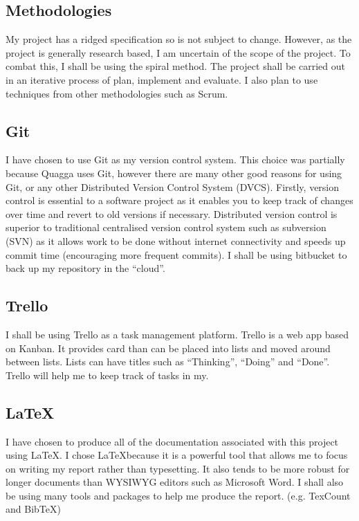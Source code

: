 \documentclass[12pt]{report}
\begin{document}
\subsection{Methodologies}
My project has a ridged specification so is not subject to change.
However, as the project is generally research based, I am uncertain of the scope
of the project. To combat this, I shall be using the spiral method. The project
shall be carried out in an iterative process of plan, implement and evaluate. I
also plan to use techniques from other methodologies such as Scrum. 

\subsection{Git}
I have chosen to use Git\cite{git} as my version control system. This choice was
partially because Quagga uses Git, however there are many other good reasons for
using Git, or any other Distributed Version Control System (DVCS).
 Firstly, version control
is essential to a software project as it enables you to keep track of changes
over time and revert to old versions if necessary. Distributed version control
is superior to traditional centralised version control system such as subversion
(SVN) as it allows work to be done without internet connectivity and speeds up
commit time (encouraging more frequent commits). I shall be using bitbucket to
back up my repository in the ``cloud''.

\subsection{Trello}
I shall be using Trello\cite{trello} as a task management platform. Trello is a
web app based on Kanban. It provides card than can be placed into lists and
moved around between lists. Lists can have titles such as ``Thinking'',
``Doing'' and ``Done''. Trello will help me to keep track of tasks in my.

\subsection{\LaTeX} 
I have chosen to produce all of the documentation associated
with this project using \LaTeX\cite{LaTeX}. I chose \LaTeX because it is a
powerful tool that allows me to focus on writing my report rather than
typesetting. It also tends to be more robust for longer documents than WYSIWYG
editors such as Microsoft Word. I shall also be using many tools and packages to
help me produce the report. (e.g.  TexCount and BibTeX)
\end{document}
